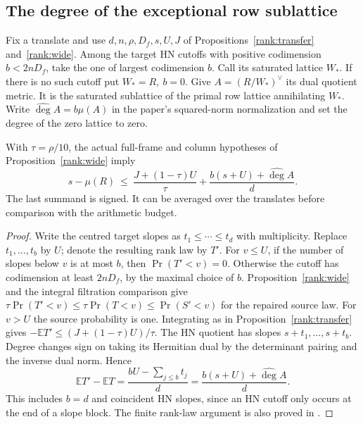 \subsection{The degree of the exceptional row sublattice}
\label{rank:exceptional-degree}

Fix a translate and use \(d,n,\rho,D_f,s,U,J\) of
Propositions~\ref{rank:transfer} and~\ref{rank:wide}. Among the target
HN cutoffs with positive codimension \(b<2nD_f\), take the one of
largest codimension \(b\). Call its saturated lattice \(W_*\).
If there is no such cutoff put \(W_*=R,\ b=0\). Give
\(A=(R/W_*)^\vee\) its dual quotient metric. It is the saturated
sublattice of the primal row lattice annihilating \(W_*\).
Write \(\widehat{\deg}A=b\mu(A)\) in the paper's squared-norm
normalization and set the degree of the zero lattice to zero.

\begin{proposition}\label{rank:signed-degree}
With \(\tau=\rho/10\), the actual full-frame and column hypotheses of
Proposition~\ref{rank:wide} imply
\[
 s-\mu(R)\ \le\ \frac{J+(1-\tau)U}{\tau}
              +\frac{b(s+U)+\widehat{\deg}A}{d}.
\]
The last summand is signed. It can be averaged over the translates
before comparison with the arithmetic budget.
\end{proposition}
\begin{proof}
Write the centred target slopes as \(t_1\le\cdots\le t_d\) with
multiplicity. Replace \(t_1,\ldots,t_b\) by \(U\); denote the resulting
rank law by \(T'\). For \(v\le U\), if the number of slopes below
\(v\) is at most \(b\), then \(\Pr(T'<v)=0\). Otherwise the cutoff
has codimension at least \(2nD_f\), by the maximal choice of \(b\).
Proposition~\ref{rank:wide} and the integral filtration comparison give
\(\tau\Pr(T'<v)\le\tau\Pr(T<v)\le\Pr(S'<v)\) for the repaired
source law. For \(v>U\) the source probability is one. Integrating
as in Proposition~\ref{rank:transfer} gives
\(-\mathbb E T'\le (J+(1-\tau)U)/\tau\).
The HN quotient has slopes \(s+t_1,\ldots,s+t_b\).
Degree changes sign on taking its Hermitian dual by the determinant
pairing and the inverse dual norm. Hence
\[
 \mathbb ET'-\mathbb ET
      =\frac{bU-\sum_{j\le b}t_j}{d}
      =\frac{b(s+U)+\widehat{\deg}A}{d}.
\]
This includes \(b=d\) and coincident HN slopes, since an HN cutoff
only occurs at the end of a slope block. The finite rank-law argument
is also proved in .
\end{proof}

